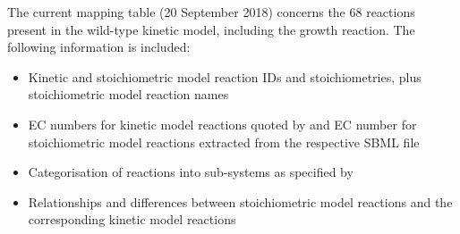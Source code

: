 \documentclass[parskip=full, numbers=noenddot]{scrreprt}
\begin{document}
The current mapping table (20 September 2018) %
concerns the 68 reactions present in the wild-type kinetic model, including the growth reaction. The following information is included:
\begin{itemize}
\item Kinetic and stoichiometric model reaction IDs and stoichiometries, plus stoichiometric model reaction names
  \item EC numbers for kinetic model reactions quoted by \citet{millard_metabolic_2017} and EC number for stoichiometric model reactions extracted from the respective SBML file
\item Categorisation of reactions into sub-systems as specified by \citet{millard_metabolic_2017}
  \item Relationships and differences between stoichiometric model reactions and the corresponding kinetic model reactions
\end{itemize}



\end{document}
